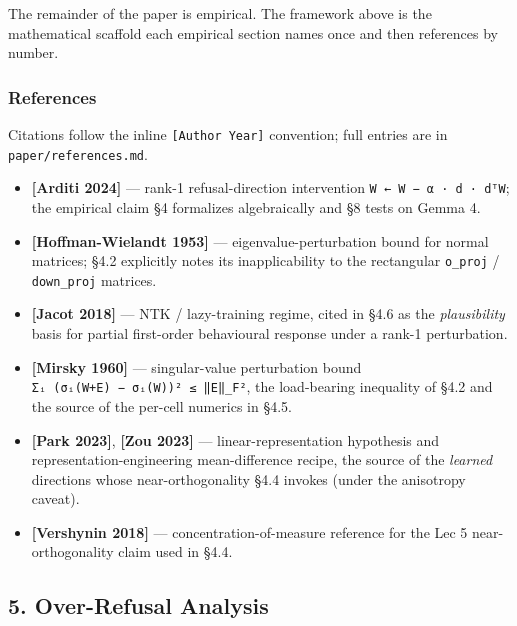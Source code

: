 \documentclass[
  11pt,
]{article}
\providecommand{\tightlist}{%
  \setlength{\itemsep}{0pt}\setlength{\parskip}{0pt}}
\begin{document}
The remainder of the paper is empirical. The framework above is the
mathematical scaffold each empirical section names once and then
references by number.

\subsubsection{References}\label{references}

Citations follow the inline \texttt{{[}Author\ Year{]}} convention; full
entries are in \texttt{paper/references.md}.

\begin{itemize}
\tightlist
\item
  \textbf{{[}Arditi 2024{]}} --- rank-1 refusal-direction intervention
  \texttt{W\ ←\ W\ −\ α\ ·\ d\ ·\ dᵀW}; the empirical claim §4
  formalizes algebraically and §8 tests on Gemma 4.
\item
  \textbf{{[}Hoffman-Wielandt 1953{]}} --- eigenvalue-perturbation bound
  for normal matrices; §4.2 explicitly notes its inapplicability to the
  rectangular \texttt{o\_proj} / \texttt{down\_proj} matrices.
\item
  \textbf{{[}Jacot 2018{]}} --- NTK / lazy-training regime, cited in
  §4.6 as the \emph{plausibility} basis for partial first-order
  behavioural response under a rank-1 perturbation.
\item
  \textbf{{[}Mirsky 1960{]}} --- singular-value perturbation bound
  \texttt{Σᵢ\ (σᵢ(W+E)\ −\ σᵢ(W))²\ ≤\ ‖E‖\_F²}, the load-bearing
  inequality of §4.2 and the source of the per-cell numerics in §4.5.
\item
  \textbf{{[}Park 2023{]}}, \textbf{{[}Zou 2023{]}} ---
  linear-representation hypothesis and representation-engineering
  mean-difference recipe, the source of the \emph{learned} directions
  whose near-orthogonality §4.4 invokes (under the anisotropy caveat).
\item
  \textbf{{[}Vershynin 2018{]}} --- concentration-of-measure reference
  for the Lec 5 near-orthogonality claim used in §4.4.
\end{itemize}

\subsection{5. Over-Refusal Analysis}\label{over-refusal-analysis}
\end{document}
